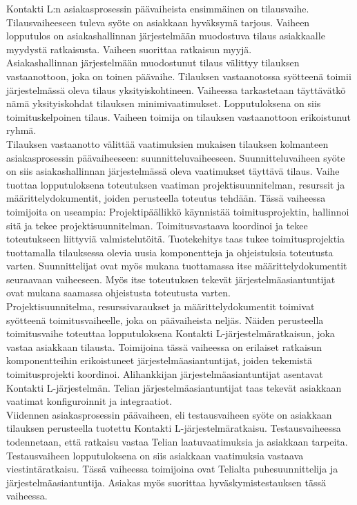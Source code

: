 \documentclass[finnish,12pt,a4paper,pdftex]{article}
\begin{document}
Kontakti L:n asiakasprosessin päävaiheista ensimmäinen on tilausvaihe. Tilausvaiheeseen tuleva syöte on asiakkaan hyväksymä tarjous. Vaiheen lopputulos on asiakashallinnan järjestelmään muodostuva tilaus asiakkaalle myydystä ratkaisusta. Vaiheen suorittaa ratkaisun myyjä.\\

Asiakashallinnan järjestelmään muodostunut tilaus välittyy tilauksen vastaanottoon, joka on toinen päävaihe. Tilauksen vastaanotossa syötteenä toimii järjestelmässä oleva tilaus yksityiskohtineen. Vaiheessa tarkastetaan täyttävätkö nämä yksityiskohdat tilauksen minimivaatimukset. Lopputuloksena on siis toimituskelpoinen tilaus. Vaiheen toimija on tilauksen vastaanottoon erikoistunut ryhmä.\\

Tilauksen vastaanotto välittää vaatimuksien mukaisen tilauksen kolmanteen asiakasprosessin päävaiheeseen: suunnitteluvaiheeseen. Suunnitteluvaiheen syöte on siis asiakashallinnan järjestelmässä oleva vaatimukset täyttävä tilaus. Vaihe tuottaa lopputuloksena toteutuksen vaatiman projektisuunnitelman, resurssit ja määrittelydokumentit, joiden perusteella toteutus tehdään. Tässä vaiheessa toimijoita on useampia: Projektipäällikkö käynnistää toimitusprojektin, hallinnoi sitä ja tekee projektisuunnitelman. Toimitusvastaava koordinoi ja tekee toteutukseen liittyviä valmistelutöitä. Tuotekehitys taas tukee toimitusprojektia tuottamalla tilauksessa olevia uusia komponentteja ja ohjeistuksia toteutusta varten. Suunnittelijat ovat myös mukana tuottamassa itse määrittelydokumentit seuraavaan vaiheeseen. Myös itse toteutuksen tekevät järjestelmäasiantuntijat ovat mukana saamassa ohjeistusta toteutusta varten.\\

Projektisuunnitelma, resurssivaraukset ja määrittelydokumentit toimivat syötteenä toimitusvaiheelle, joka on päävaiheista neljäs. Näiden perusteella toimitusvaihe toteuttaa lopputuloksena Kontakti L-järjestelmäratkaisun, joka vastaa asiakkaan tilausta. Toimijoina tässä vaiheessa on erilaiset ratkaisun komponentteihin erikoistuneet järjestelmäasiantuntijat, joiden tekemistä toimitusprojekti koordinoi. Alihankkijan järjestelmäasiantuntijat asentavat Kontakti L-järjestelmän. Telian järjestelmäasiantuntijat taas tekevät asiakkaan vaatimat konfiguroinnit ja integraatiot. \\

Viidennen asiakasprosessin päävaiheen, eli testausvaiheen syöte on asiakkaan tilauksen perusteella tuotettu Kontakti L-järjestelmäratkaisu. Testausvaiheessa todennetaan, että ratkaisu vastaa Telian laatuvaatimuksia ja asiakkaan tarpeita. Testausvaiheen lopputuloksena on siis asiakkaan vaatimuksia vastaava viestintäratkaisu. Tässä vaiheessa toimijoina ovat Telialta puhesuunnittelija ja järjestelmäasiantuntija. Asiakas myös suorittaa hyväskymistestauksen tässä vaiheessa.\\
\end{document}
